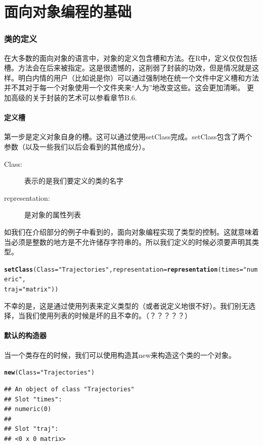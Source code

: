 \documentclass[12pt,a4paper]{article}\usepackage{graphicx, color}
\makeatletter
\newcommand{\hlfunctioncall}[1]{\textcolor[rgb]{0.501960784313725,0,0.329411764705882}{\textbf{#1}}}%
\newcommand{\hlstring}[1]{\textcolor[rgb]{0.6,0.6,1}{#1}}%
\newenvironment{kframe}{%
 \def\at@end@of@kframe{}%
 \ifinner\ifhmode%
  \def\at@end@of@kframe{\end{minipage}}%
  \begin{minipage}{\columnwidth}%
 \fi\fi%
 \def\FrameCommand##1{\hskip\@totalleftmargin \hskip-\fboxsep
 \colorbox{shadecolor}{##1}\hskip-\fboxsep
     \hskip-\linewidth \hskip-\@totalleftmargin \hskip\columnwidth}%
 \MakeFramed {\advance\hsize-\width
   \@totalleftmargin\z@ \linewidth\hsize
   \@setminipage}}%
 {\par\unskip\endMakeFramed%
 \at@end@of@kframe}
\newenvironment{knitrout}{}{} %
\makeatother
\begin{document}
\part{面向对象编程的基础}
\section{类的定义}
\scalebox{4}{\HandRight}在大多数的面向对象的语言中，对象的定义包含槽和方法。在R中，定义仅仅包括槽。方法会在后来被指定。这是很遗憾的，这削弱了封装的功效，但是情况就是这样。明白内情的用户（比如说是你）可以通过强制地在统一个文件中定义槽和方法并不其对于每一个对象使用一个文件夹来“人为”地改变这些。这会更加清晰。
更加高级的关于封装的艺术可以参看章节B.6.
\subsection{定义槽}
第一步是定义对象自身的槽。这可以通过使用setClass完成。setClass包含了两个参数（以及一些我们以后会看到的其他成分）。
\begin{description}
  \item[Class:]表示的是我们要定义的类的名字
  \item[representation:]是对象的属性列表
\end{description}
如我们在介绍部分的例子中看到的，面向对象编程实现了类型的控制。这就意味着当必须是整数的地方是不允许储存字符串的。所以我们定义的时候必须要声明其类型。
\begin{knitrout}
\color{fgcolor}\begin{kframe}
\begin{alltt}
\hlfunctioncall{setClass}(Class = \hlstring{"Trajectories"}, representation = \hlfunctioncall{representation}(times = \hlstring{"numeric"}, 
    traj = \hlstring{"matrix"}))
\end{alltt}
\end{kframe}
\end{knitrout}


\scalebox{4}{\HandRight}不幸的是，这是通过使用列表来定义类型的（或者说定义地很不好）。我们别无选择，当我们使用列表的时候是坏的且不幸的。（？？？？？）

\subsection{默认的构造器}
当一个类存在的时候，我们可以使用构造其new来构造这个类的一个对象。
\begin{knitrout}
\color{fgcolor}\begin{kframe}
\begin{alltt}
\hlfunctioncall{new}(Class = \hlstring{"Trajectories"})
\end{alltt}
\begin{verbatim}
## An object of class "Trajectories"
## Slot "times":
## numeric(0)
## 
## Slot "traj":
## <0 x 0 matrix>
\end{verbatim}
\end{kframe}
\end{knitrout}
\end{document}
